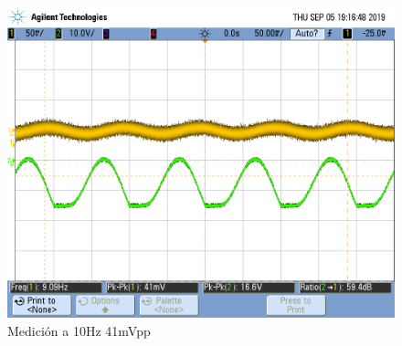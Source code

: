 \documentclass[a4paper]{article}
\begin{document}
\begin{figure}[H]
\centering
\includegraphics[width=\textwidth]{Ejercicio4/FOTOS-TP2-TC-EJ4/SaturaNoCompensado41}
\caption{Medición a 10Hz 41mVpp}
\end{figure}
\end{document}
